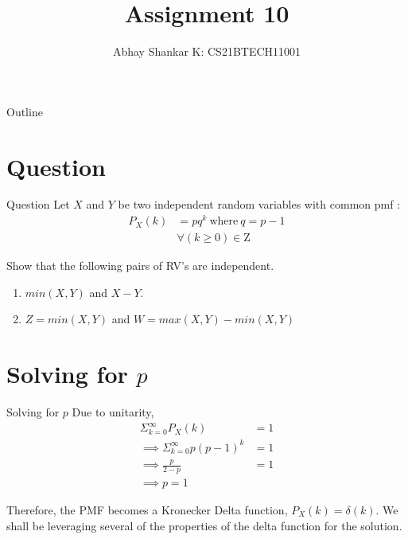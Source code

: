 \documentclass{beamer}
\begin{document}
\newcommand{\bfr}[2]{\section{#1} \begin{frame}{#1} #2 \end{frame}}

	\title{Assignment 10}
		\author{ Abhay Shankar K: CS21BTECH11001}
\date{}
	\begin{frame}
    		\titlepage
	\end{frame}

	\begin{frame}{Outline}
    		\tableofcontents
	\end{frame}

	\providecommand{\brak}[1]{\ensuremath{\left(#1\right)}}
	\providecommand{\mn}[2]{\ensuremath{min\brak{#1, #2}}}
	\providecommand{\mx}[2]{\ensuremath{max\brak{#1, #2}}}
	\providecommand{\rpr}[2]{\ensuremath{P_{#1}\left(#2\right)}} %
	\providecommand{\spr}[1]{\ensuremath{P\left(#1\right)}} %
	\newcommand{\abs}[1]{\left| #1 \right|}
	
	\providecommand{\pmf}[2]{\ensuremath{f_{#2}\left(#1\right)}}
	\providecommand{\cdf}[2]{\ensuremath{F_{#2}\left(#1\right)}}
	
	\bfr{Question}{
		Let $X$ and $Y$ be two independent random variables with common pmf :
		\begin{align}
			\rpr{X}{k} &= pq^k\ \text{where}\ q = p - 1\nonumber \\
			&\forall \brak{k \geq 0} \in \mathrm{Z} 
				\label{pmf}
		\end{align}
		
		Show that the following pairs of RV's are independent.
		\begin{enumerate}[label = \brak{\textbf{\roman*}}]
			\item $\mn{X}{Y}$ and $X - Y$.
			\item $Z = \mn{X}{Y}$ and $W = \mx{X}{Y} - \mn{X}{Y}$
		\end{enumerate}
	}
	
	\bfr{Solving for $p$}{
		Due to unitarity,
		\begin{align}
			\Sigma_{k = 0}^{\infty} \rpr{X}{k} &= 1 \nonumber \\
			\implies \Sigma_{k = 0}^{\infty} p\brak{p - 1}^k &= 1 \nonumber \\
			\implies \frac{p}{2 - p} &= 1 \nonumber \\
			\implies p = 1
				\label{p}
		\end{align}

		Therefore, the PMF becomes a Kronecker Delta function, $\rpr{X}{k} = \delta \brak{k}$. 
		We shall be leveraging several of the properties of the delta function for the solution.
	}
\end{document}
